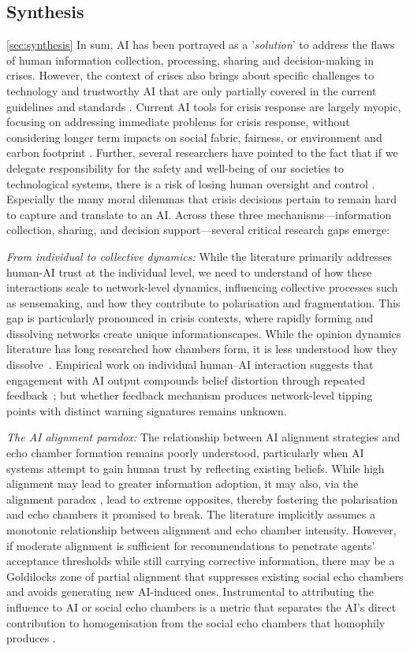 \documentclass[pdflatex,sn-apa]{sn-jnl}%
\begin{document}
\subsection{Synthesis}\ref{sec:synthesis}
In sum, AI has been portrayed as a '\textit{solution}' to address the flaws of human information collection, processing, sharing and decision-making in crises. However, the context of crises also brings about specific challenges to technology and trustworthy AI that are only partially covered in the current guidelines and standards \citep{ozmen2023six}. Current AI tools for crisis response are largely myopic, focusing on addressing immediate problems for crisis response, without considering longer term impacts on social fabric, fairness, or environment and carbon footprint \citep{harika2024harnessing}. Further, several researchers have pointed to the fact that if we delegate responsibility for the safety and well-being of our societies to technological systems, there is a risk of losing human oversight and control \citep{comes2024ai}. Especially the many moral dilemmas that crisis decisions pertain to remain hard to capture and translate to an AI. Across these three mechanisms—information collection, sharing, and decision support—several critical research gaps emerge:

\textit{From individual to collective dynamics: }While the literature primarily addresses human-AI trust at the individual level, we need to understand of how these interactions scale to network-level dynamics, influencing collective processes such as sensemaking, and how they contribute to polarisation and fragmentation. This gap is particularly pronounced in crisis contexts, where rapidly forming and dissolving networks create unique informationscapes. While the opinion dynamics literature has long researched how chambers form, it is less understood how they dissolve~\citep{Hegselmann2002,
Deffuant2000}. Empirical work on individual human--AI interaction suggests that engagement with AI output compounds belief distortion through repeated feedback~\citep{GlickmanSharot2024}; but whether feedback mechanism produces network-level tipping points with distinct warning signatures remains unknown.

\textit{The AI alignment paradox:} The relationship between AI alignment strategies and echo chamber formation remains poorly understood, particularly when AI systems attempt to gain human trust by reflecting existing beliefs. While high alignment may lead to greater information adoption, it may also, via the alignment paradox \citep{west2025ai}, lead to extreme opposites, thereby fostering the polarisation and echo chambers it promised to break. The literature implicitly assumes a monotonic relationship between alignment and echo chamber intensity. However, if moderate alignment is sufficient for recommendations to penetrate agents' acceptance thresholds while still carrying corrective information, there may be a Goldilocks zone of partial alignment that suppresses existing social echo chambers and avoids generating new AI-induced ones. Instrumental to attributing the influence to AI or social echo chambers is a metric that separates the AI's direct contribution to homogenisation from the social echo chambers that homophily produces \citep{McPherson2001}.
\end{document}
